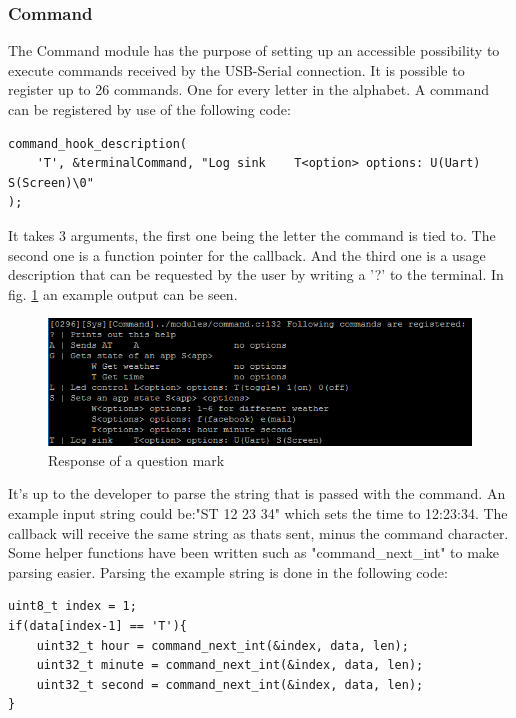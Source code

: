 \subsubsection{Command}
The Command module has the purpose of setting up an accessible possibility to execute commands received by the USB-Serial connection. It is possible to register up to 26 commands. One for every letter in the alphabet. A command can be registered by use of the following code:
\begin{verbatim}
command_hook_description(
	'T', &terminalCommand, "Log sink    T<option> options: U(Uart) S(Screen)\0"
);
\end{verbatim}
It takes 3 arguments, the first one being the letter the command is tied to. The second one is a function pointer for the callback. And the third one is a usage description that can be requested by the user by writing a '?' to the terminal. In fig. \ref{fig:command_usage} an example output can be seen.
\begin{figure}[H]
	\centering
	\label{fig:command_usage}
	\includegraphics[width=1\textwidth]{./fig/command_usage.png}
	\caption{Response of a question mark}
\end{figure}
It's up to the developer to parse the string that is passed with the command. An example input string could be:"ST 12 23 34" which sets the time to 12:23:34. The callback will receive the same string as thats sent, minus the command character. Some helper functions have been written such as "command\_next\_int" to make parsing easier. Parsing the example string is done in the following code:
\begin{verbatim}
uint8_t index = 1;
if(data[index-1] == 'T'){
	uint32_t hour = command_next_int(&index, data, len);
	uint32_t minute = command_next_int(&index, data, len);
	uint32_t second = command_next_int(&index, data, len);
}
\end{verbatim}
